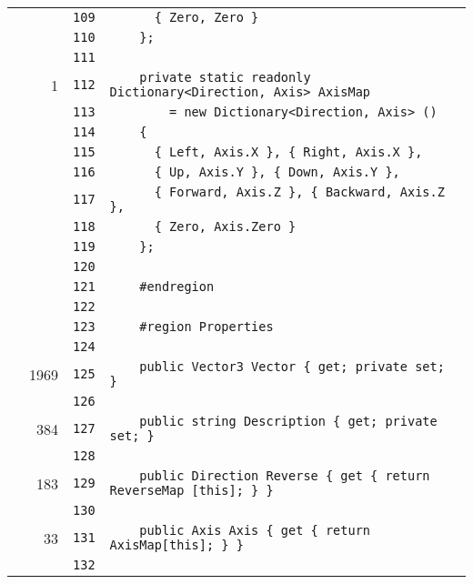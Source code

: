 \documentclass[a4paper,10pt]{article}
\begin{document}
\begin{longtable}[l]{lrrl}
\cellcolor{gray} &  & \verb~109~ & \verb~      { Zero, Zero }~\\
\cellcolor{gray} &  & \verb~110~ & \verb~    };~\\
\cellcolor{gray} &  & \verb~111~ & \verb~~\\
\cellcolor{green} & 1 & \verb~112~ & \verb~    private static readonly Dictionary<Direction, Axis> AxisMap~\\
\cellcolor{gray} &  & \verb~113~ & \verb~        = new Dictionary<Direction, Axis> ()~\\
\cellcolor{gray} &  & \verb~114~ & \verb~    {~\\
\cellcolor{gray} &  & \verb~115~ & \verb~      { Left, Axis.X }, { Right, Axis.X },~\\
\cellcolor{gray} &  & \verb~116~ & \verb~      { Up, Axis.Y }, { Down, Axis.Y },~\\
\cellcolor{gray} &  & \verb~117~ & \verb~      { Forward, Axis.Z }, { Backward, Axis.Z },~\\
\cellcolor{gray} &  & \verb~118~ & \verb~      { Zero, Axis.Zero }~\\
\cellcolor{gray} &  & \verb~119~ & \verb~    };~\\
\cellcolor{gray} &  & \verb~120~ & \verb~~\\
\cellcolor{gray} &  & \verb~121~ & \verb~    #endregion~\\
\cellcolor{gray} &  & \verb~122~ & \verb~~\\
\cellcolor{gray} &  & \verb~123~ & \verb~    #region Properties~\\
\cellcolor{gray} &  & \verb~124~ & \verb~~\\
\cellcolor{green} & 1969 & \verb~125~ & \verb~    public Vector3 Vector { get; private set; }~\\
\cellcolor{gray} &  & \verb~126~ & \verb~~\\
\cellcolor{green} & 384 & \verb~127~ & \verb~    public string Description { get; private set; }~\\
\cellcolor{gray} &  & \verb~128~ & \verb~~\\
\cellcolor{green} & 183 & \verb~129~ & \verb~    public Direction Reverse { get { return ReverseMap [this]; } }~\\
\cellcolor{gray} &  & \verb~130~ & \verb~~\\
\cellcolor{green} & 33 & \verb~131~ & \verb~    public Axis Axis { get { return AxisMap[this]; } }~\\
\cellcolor{gray} &  & \verb~132~ & \verb~~\\

\end{longtable}
\end{document}
